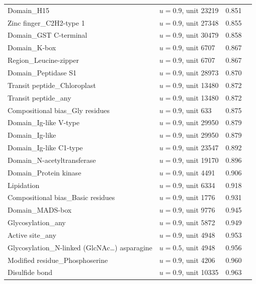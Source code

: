 \documentclass{article}
\begin{document}
\begin{longtable}{p{6.2cm}p{1.6cm}rr}
Domain\_H15 & $u{=}0.9$, unit 23219 & 0.851 \\
Zinc finger\_C2H2-type 1 & $u{=}0.9$, unit 27348 & 0.855 \\
Domain\_GST C-terminal & $u{=}0.9$, unit 30479 & 0.858 \\
Domain\_K-box & $u{=}0.9$, unit 6707 & 0.867 \\
Region\_Leucine-zipper & $u{=}0.9$, unit 6707 & 0.867 \\
Domain\_Peptidase S1 & $u{=}0.9$, unit 28973 & 0.870 \\
Transit peptide\_Chloroplast & $u{=}0.9$, unit 13480 & 0.872 \\
Transit peptide\_any & $u{=}0.9$, unit 13480 & 0.872 \\
Compositional bias\_Gly residues & $u{=}0.9$, unit 633 & 0.875 \\
Domain\_Ig-like V-type & $u{=}0.9$, unit 29950 & 0.879 \\
Domain\_Ig-like & $u{=}0.9$, unit 29950 & 0.879 \\
Domain\_Ig-like C1-type & $u{=}0.9$, unit 23547 & 0.892 \\
Domain\_N-acetyltransferase & $u{=}0.9$, unit 19170 & 0.896 \\
Domain\_Protein kinase & $u{=}0.9$, unit 4491 & 0.906 \\
Lipidation & $u{=}0.9$, unit 6334 & 0.918 \\
Compositional bias\_Basic residues & $u{=}0.9$, unit 1776 & 0.931 \\
Domain\_MADS-box & $u{=}0.9$, unit 9776 & 0.945 \\
Glycosylation\_any & $u{=}0.9$, unit 5872 & 0.949 \\
Active site\_any & $u{=}0.9$, unit 4948 & 0.953 \\
Glycosylation\_N-linked (GlcNAc\ldots{}) asparagine & $u{=}0.5$, unit 4948 & 0.956 \\
Modified residue\_Phosphoserine & $u{=}0.9$, unit 4206 & 0.960 \\
Disulfide bond & $u{=}0.9$, unit 10335 & 0.963 \\
\end{longtable}
\end{document}
